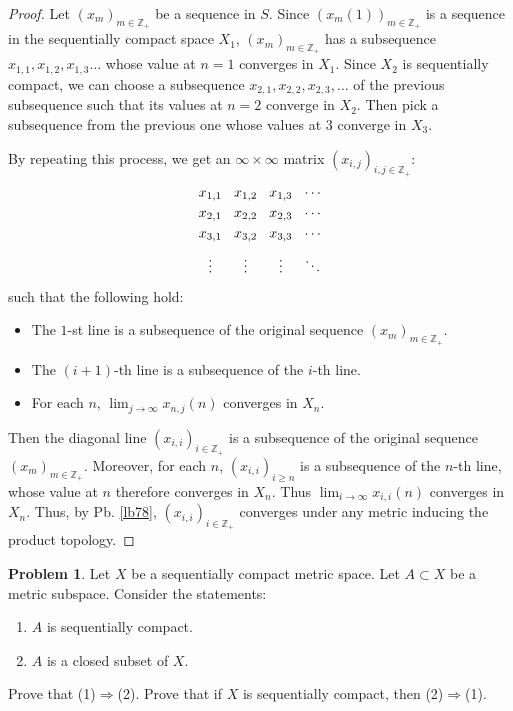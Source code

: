 \documentclass[12pt,b5paper,notitlepage]{article}
\theoremstyle{definition}
\newtheorem{prob}{\color{red}Problem}[section]
\theoremstyle{plain}
\newcommand{\Zbb}{\mathbb Z}
\numberwithin{equation}{section}
\begin{document}
\begin{proof}
Let $(x_m)_{m\in\Zbb_+}$ be a sequence in $S$. Since $(x_m(1))_{m\in\Zbb_+}$ is a sequence in the sequentially compact space $X_1$, $(x_m)_{m\in\Zbb_+}$ has a subsequence $x_{1,1},x_{1,2},x_{1,3}\dots$ whose value at $n=1$ converges in $X_1$. Since $X_2$ is sequentially compact, we can choose a subsequence $x_{2,1},x_{2,2},x_{2,3},\dots$ of the previous subsequence such that its values at $n=2$ converge in $X_2$. Then pick a subsequence from the previous one whose values at $3$ converge in $X_3$. 

By repeating this process, we get an $\infty\times\infty$ matrix $(x_{i,j})_{i,j\in\Zbb_+}$:
\begin{equation}
\begin{tikzcd}[sep=0cm]
{x_{1,1}} & {x_{1,2}} & {x_{1,3}} & \cdots \\
{x_{2,1}} & {x_{2,2}} & {x_{2,3}} & \cdots \\
{x_{3,1}} & {x_{3,2}} & {x_{3,3}} & \cdots \\
\vdots    & \vdots    & \vdots    & \ddots
\end{tikzcd}
\end{equation}
such that the following hold:
\begin{itemize}
\item The $1$-st line is a subsequence of the original sequence $(x_m)_{m\in\Zbb_+}$.
\item The $(i+1)$-th line is a subsequence of the $i$-th line.
\item For each $n$, $\lim_{j\rightarrow\infty} x_{n,j}(n)$ converges in $X_n$.
\end{itemize}
Then the diagonal line $(x_{i,i})_{i\in\Zbb_+}$ is a subsequence of the original sequence $(x_m)_{m\in\Zbb_+}$. Moreover, for each $n$, $(x_{i,i})_{i\geq n}$ is a subsequence of the $n$-th line, whose value at $n$ therefore converges in $X_n$. Thus $\lim_{i\rightarrow\infty} x_{i,i}(n)$ converges in $X_n$. Thus, by Pb. \ref{lb78}, $(x_{i,i})_{i\in\Zbb_+}$ converges under any metric inducing the product topology.
\end{proof}




\begin{prob}\label{lb90}
Let $X$ be a sequentially compact metric space. Let $A\subset X$ be a metric subspace.  Consider the statements:
\begin{enumerate}[label=(\arabic*)]
\item $A$ is sequentially compact.
\item $A$ is a closed subset of $X$.
\end{enumerate}
Prove that (1)$\Rightarrow$(2). Prove that if $X$ is sequentially compact, then (2)$\Rightarrow$(1).
\end{prob}
\end{document}

